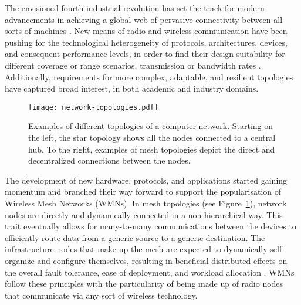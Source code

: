 The envisioned fourth industrial revolution has set the track for modern advancements in achieving a global web of pervasive connectivity between all sorts of machines \cite{akyildiz2005wireless, cilfone2019wireless}. New means of radio and wireless communication have been pushing for the technological heterogeneity of protocols, architectures, devices, and consequent performance levels, in order to find their design suitability for different coverage or range scenarios, transmission or bandwidth rates \cite{sichitiu2005wireless}. Additionally, requirements for more complex, adaptable, and resilient topologies have captured broad interest, in both academic and industry domains. 

\begin{figure} [ht]
  \begin{center}
  \texttt{[image: network-topologies.pdf]}
  \caption{Examples of different topologies of a computer network. Starting on the left, the star topology shows all the nodes connected to a central hub. To the right, examples of mesh topologies depict the direct and decentralized connections between the nodes.}
  \label{fig:mesh-network-topology}
  \end{center}
\end{figure}

The development of new hardware, protocols, and applications started gaining momentum and branched their way forward to support the popularisation of Wireless Mesh Networks (WMNs). In mesh topologies (see Figure~\ref{fig:mesh-network-topology}), network nodes are directly and dynamically connected in a non-hierarchical way. This trait eventually allows for many-to-many communications between the devices to efficiently route data from a generic source to a generic destination. The infrastructure nodes that make up the mesh are expected to dynamically self-organize and configure themselves, resulting in beneficial distributed effects on the overall fault tolerance, ease of deployment, and workload allocation \cite{cilfone2019wireless, sichitiu2005wireless}. WMNs follow these principles with the particularity of being made up of radio nodes that communicate via any sort of wireless technology.

